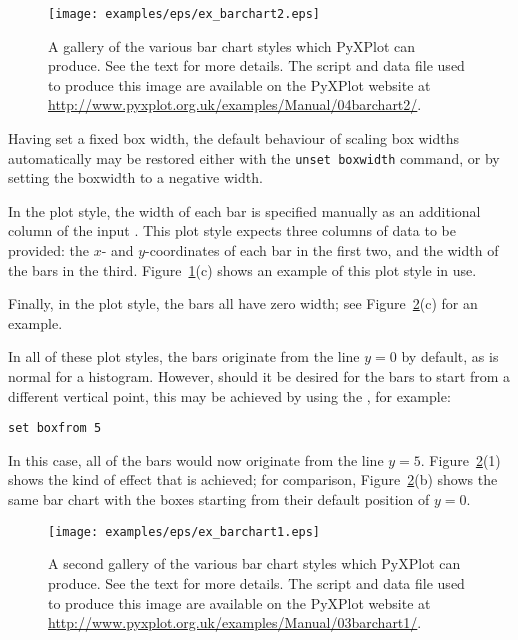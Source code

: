 \begin{figure}
\begin{center}
\texttt{[image: examples/eps/ex\_barchart2.eps]}
\end{center}
\caption[A gallery of the various bar chart styles which PyXPlot can produce]
{A gallery of the various bar chart styles which PyXPlot can produce.
See the text for more details.  The script and data file used to produce this
image are available on the PyXPlot website at
\protect\url{http://www.pyxplot.org.uk/examples/Manual/04barchart2/}.}
\label{fig:ex_barchart2}
\end{figure}

Having set a fixed box width, the default behaviour of scaling box widths
automatically may be restored either with the {\tt unset boxwidth} command,
or by setting the boxwidth to a negative width.

In the  plot style, the width of each bar is specified manually
as an additional column of the input \datafile.  This plot style expects three
columns of data to be provided: the $x$- and $y$-coordinates of each bar in the
first two, and the width of the bars in the third.
Figure~\ref{fig:ex_barchart2}(c) shows an example of this plot style in use.

Finally, in the  plot style, the bars all have zero width; see
Figure~\ref{fig:ex_barchart1}(c) for an example.

In all of these plot styles, the bars originate from the line $y=0$ by default,
as is normal for a histogram. However, should it be desired for the bars to
start from a different vertical point, this may be achieved by using the
, for example:

\begin{verbatim}
set boxfrom 5
\end{verbatim}

\noindent In this case, all of the bars would now originate from the line
$y=5$. Figure~\ref{fig:ex_barchart1}(1) shows the kind of effect that is
achieved; for comparison, Figure~\ref{fig:ex_barchart1}(b) shows the same bar
chart with the boxes starting from their default position of $y=0$.

\begin{figure}
\begin{center}
\texttt{[image: examples/eps/ex\_barchart1.eps]}
\end{center}
\caption[A second gallery of the various bar chart styles which PyXPlot can
produce]
{A second gallery of the various bar chart styles which PyXPlot can
produce. See the text for more details.  The script and data file used to
produce this image are available on the PyXPlot website at
\protect\url{http://www.pyxplot.org.uk/examples/Manual/03barchart1/}.}
\label{fig:ex_barchart1}
\end{figure}

